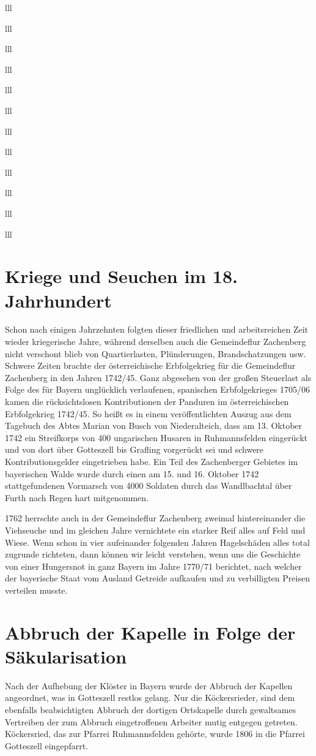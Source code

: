\documentclass[12pt,a4pager]{book}
\begin{document}
\begin{tabuluar}{lll}
\begin{tabuluar}{lll}
\begin{tabuluar}{lll}
\begin{tabuluar}{lll}
\begin{tabuluar}{lll}
\begin{tabuluar}{lll}
\begin{tabuluar}{lll}
\begin{tabuluar}{lll}
\begin{tabuluar}{lll}
\begin{tabuluar}{lll}
\begin{tabuluar}{lll}
\begin{tabuluar}{lll}
\section{Kriege und Seuchen im 18. Jahrhundert}

Schon nach einigen Jahrzehnten folgten dieser friedlichen und arbeitsreichen
Zeit wieder kriegerische Jahre, während derselben auch die Gemeindeflur
Zachenberg nicht verschont blieb von Quartierlasten, Plünderungen,
Brandschatzungen usw. Schwere Zeiten brachte der österreichische Erbfolgekrieg
für die Gemeindeflur Zachenberg in den Jahren 1742/45. Ganz abgesehen von der
großen Steuerlast als Folge des für Bayern unglücklich verlaufenen, spanischen
Erbfolgekrieges 1705/06 kamen die rücksichtslosen Kontributionen der Panduren im
österreichischen Erbfolgekrieg 1742/45. So heißt es in einem veröffentlichten
Auszug aus dem Tagebuch des Abtes Marian von Busch von Niederalteich, dass am
13. Oktober 1742 ein Streifkorps von 400 ungarischen Husaren in Ruhmannsfelden
eingerückt und von dort über Gotteszell bis Grafling vorgerückt sei und schwere
Kontributionsgelder eingetrieben habe. Ein Teil des Zachenberger Gebietes im
bayerischen Walde wurde durch einen am 15. und 16. Oktober 1742 stattgefundenen
Vormarsch von 4000 Soldaten durch das Wandlbachtal über Furth nach Regen hart
mitgenommen.

1762 herrschte auch in der Gemeindeflur Zachenberg zweimal hintereinander die
Viehseuche und im gleichen Jahre vernichtete ein starker Reif alles auf Feld und
Wiese. Wenn schon in vier aufeinander folgenden Jahren Hagelschäden alles total
zugrunde richteten, dann können wir leicht verstehen, wenn uns die Geschichte
von einer Hungersnot in ganz Bayern im Jahre 1770/71 berichtet, nach welcher der
bayerische Staat vom Ausland Getreide aufkaufen und zu verbilligten Preisen
verteilen musste.

\section{Abbruch der Kapelle in Folge der Säkularisation}

Nach der Aufhebung der Klöster in Bayern wurde der Abbruch der Kapellen
angeordnet, was in Gotteszell restlos gelang. Nur die Köckersrieder, sind dem
ebenfalls beabsichtigten Abbruch der dortigen Ortskapelle durch gewaltsames
Vertreiben der zum Abbruch eingetroffenen Arbeiter mutig entgegen getreten.
Köckersried, das zur Pfarrei Ruhmannsfelden gehörte, wurde 1806 in die Pfarrei
Gotteszell eingepfarrt.


\end{tabuluar}
\end{tabuluar}
\end{tabuluar}
\end{tabuluar}
\end{tabuluar}
\end{tabuluar}
\end{tabuluar}
\end{tabuluar}
\end{tabuluar}
\end{tabuluar}
\end{tabuluar}
\end{tabuluar}
\end{document}
